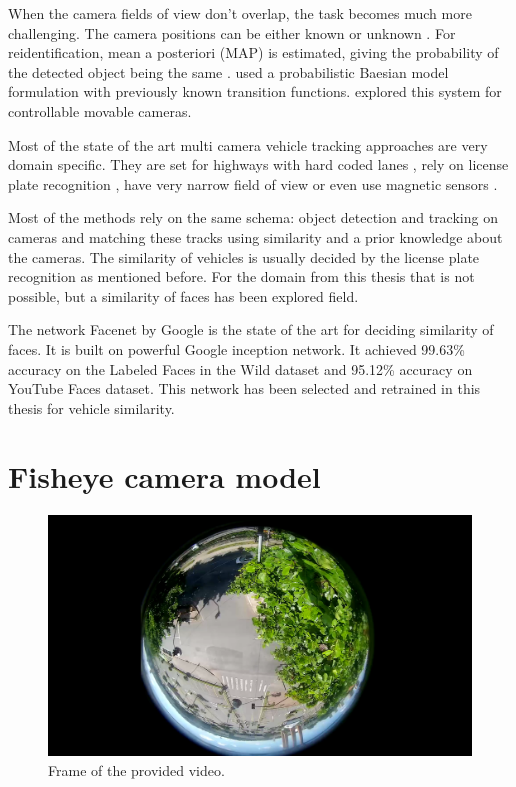 \documentclass[a4paper,12pt,titlepage, twoside]{article}
\numberwithin{figure}{section}
\begin{document}
When the camera fields of view don't overlap, the task becomes much more challenging. The camera positions can be either known \cite{rahimi2004simultaneous} or unknown \cite{makris2004bridging}. For reidentification, mean a posteriori (MAP) is estimated, giving the probability of the detected object being the same \cite{javed2005appearance, huang1997object}. \cite{kettnaker1999bayesian} used a probabilistic Baesian model formulation with previously known transition functions. \cite{kang2003continuous} explored this system for controllable movable cameras. 


Most of the state of the art multi camera vehicle tracking approaches are very domain specific. They are set for highways with hard coded lanes \cite{coifman2007vehicle, kuhne1991freeway}, rely on license plate recognition \cite{arth2007real, du2013automatic}, have very narrow field of view \cite{matei2011vehicle} or even use magnetic sensors \cite{kwong2009arterial}. 


Most of the methods rely on the same schema: object detection and tracking on cameras and matching these tracks using similarity and a prior knowledge about the cameras. The similarity of vehicles is usually decided by the license plate recognition as mentioned before. For the domain from this thesis that is not possible, but a similarity of faces has been explored field.

The network Facenet \cite{schroff2015facenet} by Google is the state of the art for deciding similarity of faces. It is built on powerful Google inception \cite{szegedy2016rethinking} network. It achieved 99.63\% accuracy on the Labeled Faces in the Wild \cite{huang2007labeled} dataset and 95.12\% accuracy on YouTube Faces \cite{wolf2011face} dataset. This network has been selected and retrained in this thesis for vehicle similarity. 


\clearpage
\section{Fisheye camera model}
\label{sec:lens}

\begin{figure}[h]
\centering
\includegraphics[width=1\linewidth]{fig/stream1.png}
\caption{Frame of the provided video.}
\label{fig:stream1}
\end{figure}
\end{document}
